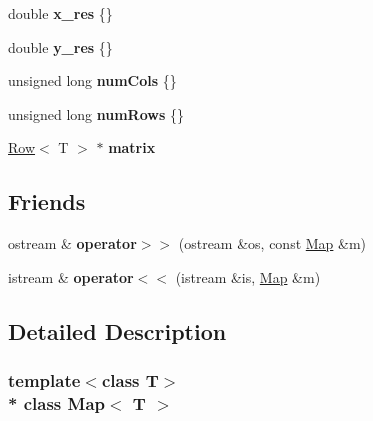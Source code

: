 \begin{DoxyCompactItemize}
\item 
double {\bfseries x\+\_\+res} \{\}\hypertarget{class_map_ad385ffe20fb2ae2dc5fa1c6edf72649f}{}\label{class_map_ad385ffe20fb2ae2dc5fa1c6edf72649f}

\item 
double {\bfseries y\+\_\+res} \{\}\hypertarget{class_map_aea5d0fe583fdc11aa94fb5eae6766644}{}\label{class_map_aea5d0fe583fdc11aa94fb5eae6766644}

\item 
unsigned long {\bfseries num\+Cols} \{\}\hypertarget{class_matrix_a341aaedcfaac978957087bd0467dc527}{}\label{class_matrix_a341aaedcfaac978957087bd0467dc527}

\item 
unsigned long {\bfseries num\+Rows} \{\}\hypertarget{class_matrix_ac1e96667d48c7845708f978ddd17475d}{}\label{class_matrix_ac1e96667d48c7845708f978ddd17475d}

\item 
\hyperlink{class_row}{Row}$<$ T $>$ $\ast$ {\bfseries matrix}\hypertarget{class_matrix_a7a143ae112112155c9622ba17dc434c7}{}\label{class_matrix_a7a143ae112112155c9622ba17dc434c7}

\end{DoxyCompactItemize}
\subsection*{Friends}
\begin{DoxyCompactItemize}
\item 
ostream \& {\bfseries operator$>$$>$} (ostream \&os, const \hyperlink{class_map}{Map} \&m)\hypertarget{class_map_a5f8b100f4f0ca3215429cc9c46cdd90a}{}\label{class_map_a5f8b100f4f0ca3215429cc9c46cdd90a}

\item 
istream \& {\bfseries operator$<$$<$} (istream \&is, \hyperlink{class_map}{Map} \&m)\hypertarget{class_map_a2cb87ce0bbf263326a632b9537725d96}{}\label{class_map_a2cb87ce0bbf263326a632b9537725d96}

\end{DoxyCompactItemize}


\subsection{Detailed Description}
\subsubsection*{template$<$class T$>$\\*
class Map$<$ T $>$}


